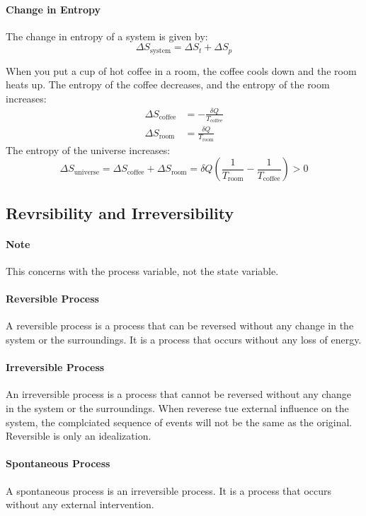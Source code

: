 \documentclass[11pt]{report}
\begin{document}
\paragraph{Change in Entropy} The change in entropy of a system is given by:
\begin{equation}
    \Delta S_{\text{system}} = \Delta S_t + \Delta S_{p}
\end{equation}
\begin{example}
    When you put a cup of hot coffee in a room, the coffee cools down and the room heats up. The entropy of the coffee decreases, and the entropy of the room increases:
    \begin{align*}
        \Delta S_{\text{coffee}} &= -\frac{\delta Q}{T_{\text{coffee}}} \\
        \Delta S_{\text{room}} &= \frac{\delta Q}{T_{\text{room}}}
    \end{align*}
    The entropy of the universe increases:
    $$
    \Delta S_{\text{universe}} = \Delta S_{\text{coffee}} + \Delta S_{\text{room}} = \delta Q(\frac{1}{T_{\text{room}}} - \frac{1}{T_{\text{coffee}}}) > 0
    $$
\end{example}
\subsection{Revrsibility and Irreversibility}
\paragraph{Note} This concerns with the process variable, not the state variable.
\paragraph{Reversible Process} A reversible process is a process that can be reversed without any change in the system or the surroundings. It is a process that occurs without any loss of energy.
\paragraph{Irreversible Process} An irreversible process is a process that cannot be reversed without any change in the system or the surroundings. When reverese tue external influence on the system, the complciated sequence of events will not be the same as the original. Reversible is only an idealization.
\paragraph{Spontaneous Process} A spontaneous process is an irreversible process. It is a process that occurs without any external intervention.
\end{document}
